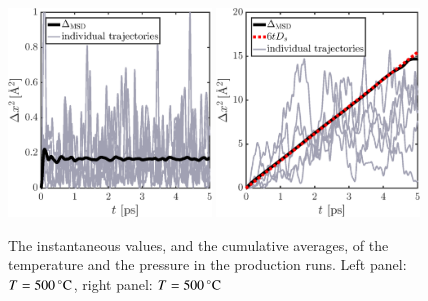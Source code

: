 \begin{figure}[!ht]
\begin{center}
  \includegraphics[width=0.48\textwidth]{../figures/MSD-500} 
    \includegraphics[width=0.48\textwidth]{../figures/MSD-700} 
  \caption{The instantaneous values, and the cumulative averages, of the temperature and the pressure in the production runs. Left panel: $T=\unit[500]{^\circ C}$,  right panel: $T=\unit[500]{^\circ C}$}
  \label{fig:prod}
\end{center}
\end{figure}

